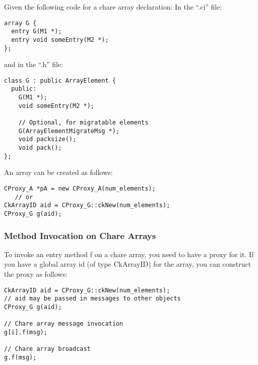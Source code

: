 Given the following code for a chare array declaration:
In the ``.ci'' file:

\begin{verbatim}
array G {
  entry G(M1 *);
  entry void someEntry(M2 *);
};
\end{verbatim}

and in the ``.h'' file:

\begin{verbatim}
class G : public ArrayElement {
  public:
    G(M1 *);
    void someEntry(M2 *);

    // Optional, for migratable elements
    G(ArrayElementMigrateMsg *);
    void packsize();
    void pack();
};
\end{verbatim}

An array can be created as follows:

\begin{verbatim}
CProxy_A *pA = new CProxy_A(num_elements);
   // or
CkArrayID aid = CProxy_G::ckNew(num_elements);
CProxy_G g(aid);
\end{verbatim}


\subsubsection{Method Invocation on Chare Arrays}

To invoke an entry method f on a chare array, you need to have a proxy
for it.  If you have a global array id (of type CkArrayID) for the
array, you can construct the proxy as follows:

\begin{verbatim}
CkArrayID aid = CProxy_G::ckNew(num_elements);
// aid may be passed in messages to other objects
CProxy_G g(aid);

// Chare array message invocation
g[i].f(msg);

// Chare array broadcast
g.f(msg);
\end{verbatim}





